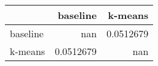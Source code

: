 \begin{tabular}{lrr}
\toprule
          &    baseline &     k-means \\
\midrule
 baseline & nan         &   0.0512679 \\
 k-means  &   0.0512679 & nan         \\
\bottomrule
\end{tabular}
